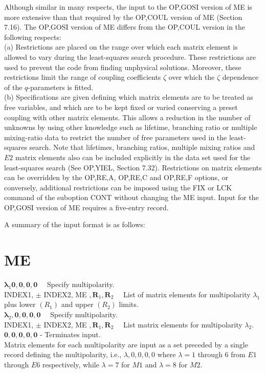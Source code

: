 \documentclass[10pt]{article}
\begin{document}
Although similar in many respects, the input to the OP,GOSI version of ME is more extensive than that required by the OP,COUL version of ME (Section 7.16). The OP,GOSI version of ME differs from the OP,COUL version in the following respects:\\
(a) Restrictions are placed on the range over which each matrix element is allowed to vary during the least-squares search procedure. These restrictions are used to prevent the code from finding unphysical solutions. Moreover, these restrictions limit the range of coupling coefficients $\zeta$ over which the $\zeta$ dependence of the $q$-parameters is fitted.\\
(b) Specifications are given defining which matrix elements are to be treated as free variables, and which are to be kept fixed or varied conserving a preset coupling with other matrix elements. This allows a reduction in the number of unknowns by using other knowledge such as lifetime, branching ratio or multiple mixing-ratio data to restrict the number of free parameters used in the least-squares search. Note that lifetimes, branching ratios, multiple mixing ratios and $E 2$ matrix elements also can be included explicitly in the data set used for the least-squares search (See OP,YIEL, Section 7.32). Restrictions on matrix elements can be overridden by the OP,RE,A, OP,RE,C and OP,RE,F options, or conversely, additional restrictions can be imposed using the FIX or LCK command of the suboption CONT without changing the ME input. Input for the OP,GOSI version of ME requires a five-entry record.

A summary of the input format is as follows:

\section*{ME}
$\boldsymbol{\lambda}_{1} \mathbf{0}, \mathbf{0}, \mathbf{0}, \mathbf{0} \quad$ Specify multipolarity.\\
INDEX1, $\pm$ INDEX2, ME $, \mathbf{R}_{1}, \mathbf{R}_{2} \quad$ List of matrix elements for multipolarity $\lambda_{1}$ plus lower $\left(R_{1}\right)$ and upper $\left(R_{2}\right)$ limits.\\
$\boldsymbol{\lambda}_{2}, \mathbf{0}, \mathbf{0}, \mathbf{0}, \mathbf{0} \quad$ Specify multipolarity.\\
INDEX1, $\pm$ INDEX2, ME $, \mathbf{R}_{1}, \mathbf{R}_{2} \quad$ List matrix elements for multipolarity $\lambda_{2}$.\\
$\mathbf{0}, \mathbf{0}, \mathbf{0}, \mathbf{0}, \mathbf{0}$ - Terminates input.\\
Matrix elements for each multipolarity are input as a set preceded by a single record defining the multipolarity, i.e., $\lambda, 0,0,0,0$ where $\lambda=1$ through 6 from $E 1$ through $E 6$ respectively, while $\lambda=7$ for $M 1$ and $\lambda=8$ for $M 2$.
\end{document}
